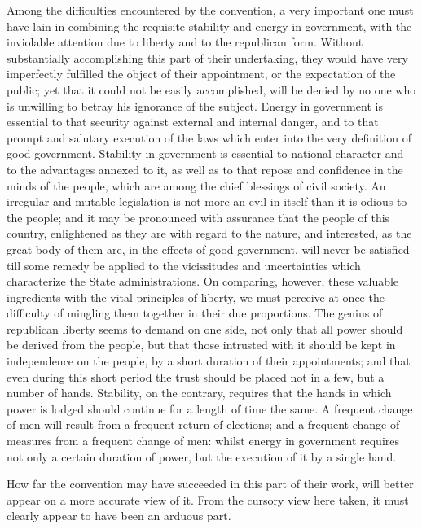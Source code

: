 Among the difficulties encountered by the convention, a very important one must have lain in combining the requisite stability and energy in government, with the inviolable attention due to liberty and to the republican form. Without substantially accomplishing this part of their undertaking, they would have very imperfectly fulfilled the object of their appointment, or the expectation of the public; yet that it could not be easily accomplished, will be denied by no one who is unwilling to betray his ignorance of the subject. Energy in government is essential to that security against external and internal danger, and to that prompt and salutary execution of the laws which enter into the very definition of good government. Stability in government is essential to national character and to the advantages annexed to it, as well as to that repose and confidence in the minds of the people, which are among the chief blessings of civil society. An irregular and mutable legislation is not more an evil in itself than it is odious to the people; and it may be pronounced with assurance that the people of this country, enlightened as they are with regard to the nature, and interested, as the great body of them are, in the effects of good government, will never be satisfied till some remedy be applied to the vicissitudes and uncertainties which characterize the State administrations. On comparing, however, these valuable ingredients with the vital principles of liberty, we must perceive at once the difficulty of mingling them together in their due proportions. The genius of republican liberty seems to demand on one side, not only that all power should be derived from the people, but that those intrusted with it should be kept in independence on the people, by a short duration of their appointments; and that even during this short period the trust should be placed not in a few, but a number of hands. Stability, on the contrary, requires that the hands in which power is lodged should continue for a length of time the same. A frequent change of men will result from a frequent return of elections; and a frequent change of measures from a frequent change of men: whilst energy in government requires not only a certain duration of power, but the execution of it by a single hand.

How far the convention may have succeeded in this part of their work, will better appear on a more accurate view of it. From the cursory view here taken, it must clearly appear to have been an arduous part.

